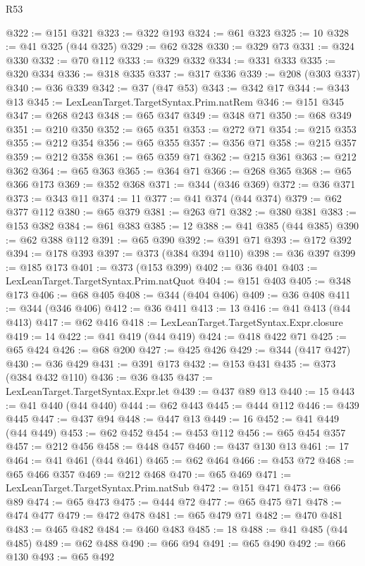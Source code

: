 \begin{lexlean}{R53}
\begin{coremodule}
@322 := @151 @321
@323 := @322 @193
@324 := @61 @323
@325 := 10
@328 := @41 @325 (@44 @325)
@329 := @62 @328
@330 := @329 @73
@331 := @324 @330
@332 := @70 @112
@333 := @329 @332
@334 := @331 @333
@335 := @320 @334
@336 := @318 @335
@337 := @317 @336
@339 := @208 (@303 @337)
@340 := @36 @339
@342 := @37 (@47 @53)
@343 := @342 @17
@344 := @343 @13
@345 := LexLeanTarget.TargetSyntax.Prim.natRem
@346 := @151 @345
@347 := @268 @243
@348 := @65 @347
@349 := @348 @71
@350 := @68 @349
@351 := @210 @350
@352 := @65 @351
@353 := @272 @71
@354 := @215 @353
@355 := @212 @354
@356 := @65 @355
@357 := @356 @71
@358 := @215 @357
@359 := @212 @358
@361 := @65 @359 @71
@362 := @215 @361
@363 := @212 @362
@364 := @65 @363
@365 := @364 @71
@366 := @268 @365
@368 := @65 @366 @173
@369 := @352 @368
@371 := @344 (@346 @369)
@372 := @36 @371
@373 := @343 @11
@374 := 11
@377 := @41 @374 (@44 @374)
@379 := @62 @377 @112
@380 := @65 @379
@381 := @263 @71
@382 := @380 @381
@383 := @153 @382
@384 := @61 @383
@385 := 12
@388 := @41 @385 (@44 @385)
@390 := @62 @388 @112
@391 := @65 @390
@392 := @391 @71
@393 := @172 @392
@394 := @178 @393
@397 := @373 (@384 @394 @110)
@398 := @36 @397
@399 := @185 @173
@401 := @373 (@153 @399)
@402 := @36 @401
@403 := LexLeanTarget.TargetSyntax.Prim.natQuot
@404 := @151 @403
@405 := @348 @173
@406 := @68 @405
@408 := @344 (@404 @406)
@409 := @36 @408
@411 := @344 (@346 @406)
@412 := @36 @411
@413 := 13
@416 := @41 @413 (@44 @413)
@417 := @62 @416
@418 := LexLeanTarget.TargetSyntax.Expr.closure
@419 := 14
@422 := @41 @419 (@44 @419)
@424 := @418 @422 @71
@425 := @65 @424
@426 := @68 @200
@427 := @425 @426
@429 := @344 (@417 @427)
@430 := @36 @429
@431 := @391 @173
@432 := @153 @431
@435 := @373 (@384 @432 @110)
@436 := @36 @435
@437 := LexLeanTarget.TargetSyntax.Expr.let
@439 := @437 @89 @13
@440 := 15
@443 := @41 @440 (@44 @440)
@444 := @62 @443
@445 := @444 @112
@446 := @439 @445
@447 := @437 @94
@448 := @447 @13
@449 := 16
@452 := @41 @449 (@44 @449)
@453 := @62 @452
@454 := @453 @112
@456 := @65 @454 @357
@457 := @212 @456
@458 := @448 @457
@460 := @437 @130 @13
@461 := 17
@464 := @41 @461 (@44 @461)
@465 := @62 @464
@466 := @453 @72
@468 := @65 @466 @357
@469 := @212 @468
@470 := @65 @469
@471 := LexLeanTarget.TargetSyntax.Prim.natSub
@472 := @151 @471
@473 := @66 @89
@474 := @65 @473
@475 := @444 @72
@477 := @65 @475 @71
@478 := @474 @477
@479 := @472 @478
@481 := @65 @479 @71
@482 := @470 @481
@483 := @465 @482
@484 := @460 @483
@485 := 18
@488 := @41 @485 (@44 @485)
@489 := @62 @488
@490 := @66 @94
@491 := @65 @490
@492 := @66 @130
@493 := @65 @492

\end{coremodule}
\end{lexlean}
